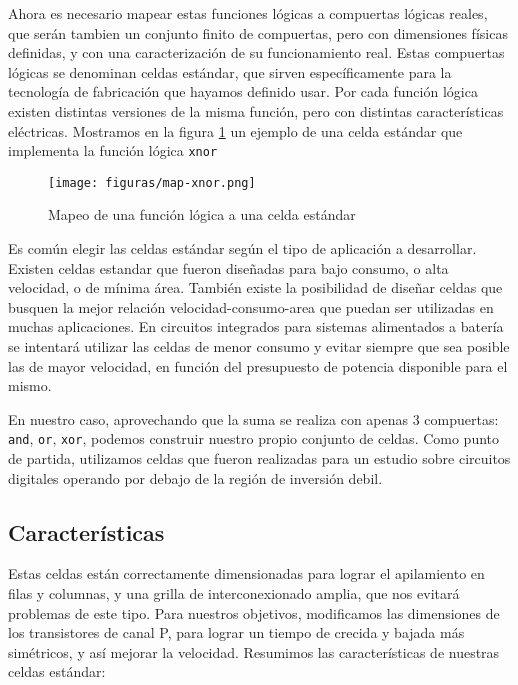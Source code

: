 Ahora es necesario mapear estas funciones lógicas a compuertas lógicas reales, que serán tambien un conjunto finito de compuertas, pero con dimensiones físicas definidas, y con una caracterización de su funcionamiento real. Estas compuertas lógicas se denominan celdas estándar, que sirven específicamente para la tecnología de fabricación que hayamos definido usar. Por cada función lógica existen distintas versiones de la misma función, pero con distintas características eléctricas. Mostramos en la figura \ref{fig:map-xnor} un ejemplo de una celda estándar que implementa la función lógica \verb.xnor.




\begin{figure}[h]
\centering
\texttt{[image: figuras/map-xnor.png]}
  \caption{Mapeo de una función lógica a una celda estándar}
  \label{fig:map-xnor}
\end{figure}

Es común elegir las celdas estándar según el tipo de aplicación a desarrollar. Existen celdas estandar que fueron diseñadas para bajo consumo, o alta velocidad, o de mínima área. También existe la posibilidad de diseñar celdas que busquen la mejor relación velocidad-consumo-area que puedan ser utilizadas en muchas aplicaciones. En circuitos integrados para sistemas alimentados a batería se intentará utilizar las celdas de menor consumo y evitar siempre que sea posible las de mayor velocidad, en función del presupuesto de potencia disponible para el mismo.

En nuestro caso, aprovechando que la suma se realiza con apenas 3 compuertas: \verb.and., \verb.or., \verb.xor., podemos construir nuestro propio conjunto de celdas. Como punto de partida, utilizamos celdas que fueron realizadas para un estudio sobre circuitos digitales operando por debajo de la región de inversión debil\cite{subthresholdArith}.
\subsection{Características}
Estas celdas están correctamente dimensionadas para lograr el apilamiento en filas y columnas, y una grilla de interconexionado amplia, que nos evitará problemas de este tipo. Para nuestros objetivos, modificamos las dimensiones de los transistores de canal P, para lograr un tiempo de crecida y bajada más simétricos, y así mejorar la velocidad. Resumimos las características de nuestras celdas estándar:


